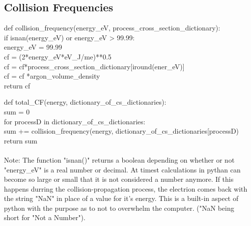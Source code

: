 \documentclass[12pt]{article}
\begin{document}
\subsection{Collision Frequencies}


{\selectfont def collision\_frequency(energy\_eV, process\_cross\_section\_dictionary):\\
	\hspace*{3ex}if isnan(energy\_eV) or energy\_eV > 99.99:\\
	\hspace*{6ex}energy\_eV = 99.99\\
	\hspace*{3ex}cf = (2*energy\_eV*eV\_J/me)**0.5\\
	\hspace*{3ex}cf = cf*process\_cross\_section\_dictionary[iround(ener\_eV)]\\
	\hspace*{3ex}cf = cf *argon\_volume\_density\\
	\hspace*{3ex}return cf\\
}



{\selectfont def total\_CF(energy, dictionary\_of\_cs\_dictionaries):\\
	\hspace*{2ex}sum = 0\\
	\hspace*{2ex}for processD in dictionary\_of\_cs\_dictionaries:\\
	\hspace*{4ex}sum += collision\_frequency(energy, dictionary\_of\_cs\_dictionaries[processD)\\
	\hspace*{2ex}return sum\\
	\\}
Note: The function "isnan()" returns a boolean depending on whether or not "energy\_eV" is a real number or decimal. At timest 
calculations in pythan can become so large or  small that it is not considered a number anymore. If this happens durring the 
collision-propagation process, the electrion comes back with the string "NaN" in place of a value for it's energy. This is a built-in aspect of python with the purpose as to not to overwhelm the computer. ("NaN being short for "Not a Number").\\



\end{document}
